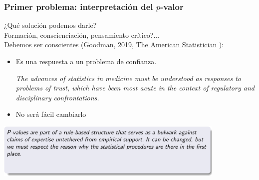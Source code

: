 \documentclass[9pt]{beamer}
\begin{document}
\begin{frame}
  \frametitle{Primer problema: interpretación del $p$-valor}
    \begin{overlayarea}{\textwidth}{0.8\textheight}
  ¿Qué solución podemos darle?\\
  Formación, conscienciación, pensamiento crítico?...\\
  Debemos ser conscientes (Goodman,
  2019, \href{https://doi.org/10.1080/00031305.2018.1558111}{The
    American Statistician} ): \onslide<+->
  \begin{itemize}
  \item Es una respuesta a un problema de confianza.\onslide<+->
    \begin{block}{}
      \textit{The advances of statistics in medicine must be understood as responses to problems of trust, which have been most acute in the context of regulatory and disciplinary confrontations.}
    \end{block}
  \item<+-> No será fácil cambiarlo\onslide<+->
  \end{itemize}
  \begin{center}
      \includegraphics[width=11cm]{images/goodman_bayes_1}
    \end{center}
\end{overlayarea} 
\end{frame}
\end{document}
